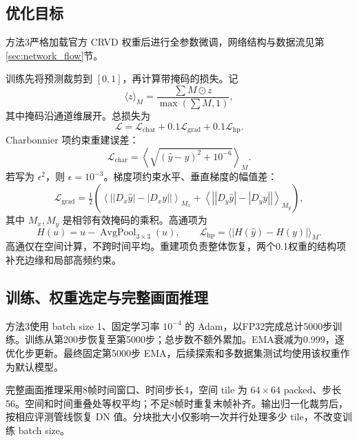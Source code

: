 \documentclass[11pt,a4paper,UTF8,fontset=fandol]{ctexart}
\begin{document}
\subsection{优化目标}

方法3严格加载官方 CRVD 权重后进行全参数微调，网络结构与数据流见第\ref{sec:network_flow}节。

训练先将预测裁剪到 $[0,1]$，再计算带掩码的损失。记
\begin{equation}
 \langle z\rangle_M=\frac{\sum M\odot z}{\max(\sum M,1)},
\end{equation}
其中掩码沿通道维展开。总损失为
\begin{equation}
 \mathcal L=\mathcal L_{\mathrm{char}}+0.1\mathcal L_{\mathrm{grad}}+0.1\mathcal L_{\mathrm{hp}}.
 \label{eq:loss}
\end{equation}
Charbonnier 项\cite{r13}约束重建误差：
\begin{equation}
 \mathcal L_{\mathrm{char}}=\left\langle\sqrt{(\hat y-y)^2+10^{-6}}\right\rangle_M.
\end{equation}
若写为 $\epsilon^2$，则 $\epsilon=10^{-3}$。梯度项约束水平、垂直梯度的幅值差：
\begin{equation}
 \mathcal L_{\mathrm{grad}}=\tfrac12\left(
 \left\langle\left||D_x\hat y|-|D_xy|\right|\right\rangle_{M_x}+
 \left\langle\left||D_y\hat y|-|D_yy|\right|\right\rangle_{M_y}\right),
\end{equation}
其中 $M_x,M_y$ 是相邻有效掩码的乘积。高通项为
\begin{equation}
 H(u)=u-\operatorname{AvgPool}_{3\times3}(u),\qquad
 \mathcal L_{\mathrm{hp}}=\langle|H(\hat y)-H(y)|\rangle_M.
\end{equation}
高通仅在空间计算，不跨时间平均。重建项负责整体恢复，两个0.1权重的结构项补充边缘和局部高频约束。

\subsection{训练、权重选定与完整画面推理}

方法3使用 batch size 1、固定学习率 $10^{-4}$ 的 Adam，以FP32完成总计5000步训练。训练从第200步恢复至第5000步；总步数不额外累加。EMA衰减为0.999，逐优化步更新。最终固定第5000步 EMA，后续探索和多数据集测试均使用该权重作为默认模型。

完整画面推理采用8帧时间窗口、时间步长4，空间 tile 为 $64\times64$ packed、步长56。空间和时间重叠处等权平均；不足8帧时重复末帧补齐。输出归一化裁剪后，按相应评测管线恢复 DN 值。分块批大小仅影响一次并行处理多少 tile，不改变训练 batch size。
\end{document}
